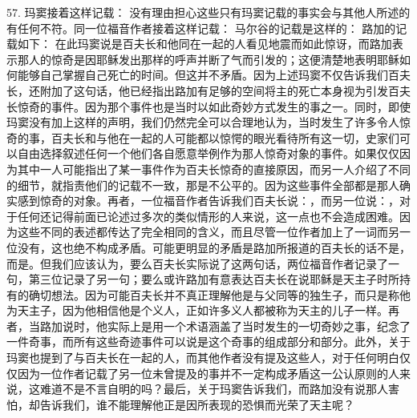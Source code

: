 57. 玛窦接着这样记载： 没有理由担心这些只有玛窦记载的事实会与其他人所述的有任何不符。同一位福音作者接着这样记载： 马尔谷的记载是这样的： 路加的记载如下： 在此玛窦说是百夫长和他同在一起的人看见地震而如此惊讶，而路加表示那人的惊奇是因耶稣发出那样的呼声并断了气而引发的；这便清楚地表明耶稣如何能够自己掌握自己死亡的时间。但这并不矛盾。因为上述玛窦不仅告诉我们百夫长，还附加了这句话，他已经指出路加有足够的空间将主的死亡本身视为引发百夫长惊奇的事件。因为那个事件也是当时以如此奇妙方式发生的事之一。同时，即使玛窦没有加上这样的声明，我们仍然完全可以合理地认为，当时发生了许多令人惊奇的事，百夫长和与他在一起的人可能都以惊愕的眼光看待所有这一切，史家们可以自由选择叙述任何一个他们各自愿意举例作为那人惊奇对象的事件。如果仅仅因为其中一人可能指出了某一事件作为百夫长惊奇的直接原因，而另一人介绍了不同的细节，就指责他们的记载不一致，那是不公平的。因为这些事件全部都是那人确实感到惊奇的对象。再者，一位福音作者告诉我们百夫长说：，而另一位说：，对于任何还记得前面已论述过多次的类似情形的人来说，这一点也不会造成困难。因为这些不同的表述都传达了完全相同的含义，而且尽管一位作者加上了一词而另一位没有，这也绝不构成矛盾。可能更明显的矛盾是路加所报道的百夫长的话不是，而是。但我们应该认为，要么百夫长实际说了这两句话，两位福音作者记录了一句，第三位记录了另一句；要么或许路加有意表达百夫长在说耶稣是天主子时所持有的确切想法。因为可能百夫长并不真正理解他是与父同等的独生子，而只是称他为天主子，因为他相信他是个义人，正如许多义人都被称为天主的儿子一样。再者，当路加说时，他实际上是用一个术语涵盖了当时发生的一切奇妙之事，纪念了一件奇事，而所有这些奇迹事件可以说是这个奇事的组成部分和部分。此外，关于玛窦也提到了与百夫长在一起的人，而其他作者没有提及这些人，对于任何明白仅仅因为一位作者记载了另一位未曾提及的事并不一定构成矛盾这一公认原则的人来说，这难道不是不言自明的吗？最后，关于玛窦告诉我们，而路加没有说那人害怕，却告诉我们，谁不能理解他正是因所表现的恐惧而光荣了天主呢？\par


